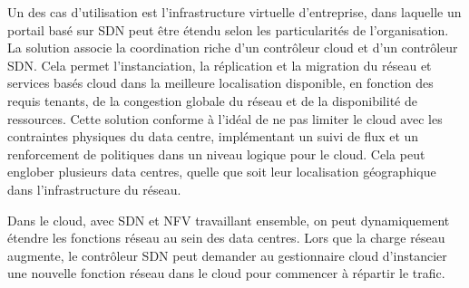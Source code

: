 Un des cas d'utilisation est l'infrastructure virtuelle d'entreprise, dans laquelle un portail basé sur SDN peut être étendu selon les particularités de l'organisation. La solution associe la coordination riche d'un contrôleur cloud et d'un contrôleur SDN. Cela permet l'instanciation, la réplication et la migration du réseau et services basés cloud dans la meilleure localisation disponible, en fonction des requis tenants, de la congestion globale du réseau et de la disponibilité de ressources. Cette solution conforme à l'idéal de ne pas limiter le cloud avec les contraintes physiques du data centre,   implémentant un suivi de flux et un renforcement de politiques dans un niveau logique pour le cloud. Cela peut englober plusieurs data centres, quelle que soit leur localisation géographique dans l'infrastructure du réseau.



Dans le cloud, avec SDN et NFV travaillant ensemble, on peut dynamiquement étendre les fonctions réseau au sein des data centres. Lors que la charge réseau augmente, le contrôleur SDN peut demander au gestionnaire cloud d'instancier une nouvelle fonction réseau dans le cloud pour commencer à répartir le trafic. 

